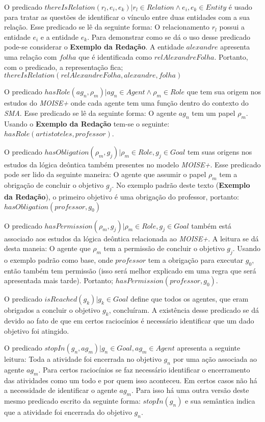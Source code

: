 O predicado $thereIsRelation(r_l,e_i,e_k) | r_l \in Relation \wedge  e_i, e_k \in Entity$ é usado para tratar as questões de identificar o vínculo entre duas entidades com a sua relação. Esse predicado se lê da seguinte forma: O relacionamento $r_l$ possui a entidade $e_i$ e a entidade $e_k$. Para demonstrar como se dá o uso desse predicado pode-se considerar o \textbf{Exemplo da Redação}. A entidade $alexandre$ apresenta uma relação com $folha$ que é identificada como $relAlexandreFolha$. Portanto, com o predicado, a representação fica; $thereIsRelation(relAlexandreFolha,alexandre,folha)$

O predicado $hasRole(ag_n,\rho_m) | ag_n \in Agent \wedge \rho_m \in Role$ que tem sua origem nos estudos do \textit{MOISE+} onde cada agente tem uma função dentro do contexto do \textit{SMA}. Esse predicado se lê da seguinte forma: O agente $ag_n$ tem um papel $\rho_m$. Usando o \textbf{Exemplo da Redação} tem-se o seguinte: $hasRole(artistoteles,professor)$. 

O predicado $hasObligation(\rho_m,g_j) | \rho_m \in Role, g_j \in Goal $ tem suas origens nos estudos da lógica deôntica também presentes no modelo \textit{MOISE+}. Esse predicado pode ser lido da seguinte maneira: O agente que assumir o papel $\rho_m$ tem a obrigação de concluir o objetivo $g_j$. No exemplo padrão deste texto (\textbf{Exemplo da Redação}), o primeiro objetivo é uma obrigação do professor, portanto: $hasObligation(professor,g_0)$

O predicado $hasPermission(\rho_m, g_j) | \rho_m \in Role, g_j \in Goal $ também está associado aos estudos da lógica deôntica relacionada ao \textit{MOISE+}. A leitura se dá desta maneia: O agente que $\rho_m$ tem a permissão de concluir o objetivo $g_j$. Usando o exemplo padrão como base, onde $professor$ tem a obrigação para executar $g_0$, então também tem permissão (isso será melhor explicado em uma regra que será apresentada mais tarde). Portanto; $hasPermission(professor,g_0)$.  

O predicado $isReached(g_k) | g_k \in Goal $ define que todos os agentes, que eram obrigados a concluir o objetivo $g_k$, concluíram. A existência desse predicado se dá devido ao fato de que em certos raciocínios é necessário identificar que um dado objetivo foi atingido. 

O predicado $stopIn(g_n, ag_m) | g_n \in Goal, ag_m \in Agent$ apresenta a seguinte leitura: Toda a atividade foi encerrada no objetivo $g_n$ por uma ação associada ao agente $ag_m$. Para certos raciocínios se faz necessário identificar o encerramento das atividades como um todo e por quem isso aconteceu. Em certos casos não há a necessidade de identificar o agente $ag_m$. Para isso há uma outra versão deste mesmo predicado escrito da seguinte forma: $stopIn(g_n)$ e sua semântica indica que a atividade foi encerrada do objetivo $g_n$.

